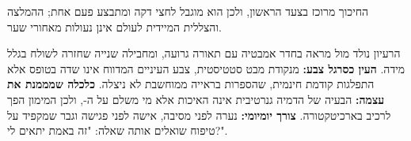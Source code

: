{החיכוך מרוכז בצעד הראשון, ולכן הוא מוגבל לחצי דקה ומתבצע פעם אחת; ההמלצה והצללית המיידית לעולם אינן נעולות מאחורי שער.

\begin{examplebox}
הרעיון נולד מול מראה בחדר אמבטיה עם תאורה גרועה, ומחבילה שנייה שחזרה לשולח בגלל מידה. \textbf{העין כסרגל צבע:} מנקודת מבט סטטיסטית, צבע העיניים המדווח אינו שדה בטופס אלא התפלגות קודמת חינמית, שהספרות בראייה ממוחשבת לא ניצלה. \textbf{כלכלה שמממנת את עצמה:} הבעיה של הדמיה גנרטיבית אינה האיכות אלא מי משלם על ה-, ולכן המימון הפך לרכיב בארכיטקטורה. \textbf{צורך יומיומי:} נערה לפני מסיבה, אישה לפני פגישה וגבר שמקפיד על טיפוח שואלים אותה שאלה: "זה באמת יתאים לי?".
\end{examplebox}}
